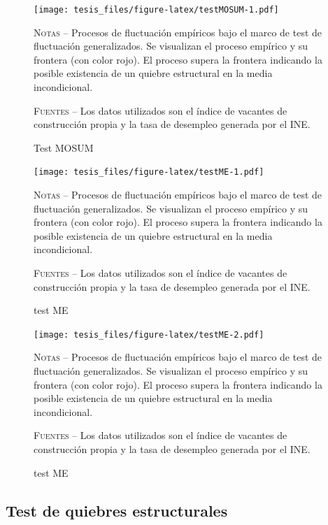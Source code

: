 \documentclass[12pt,oneside]{reedthesis}
\begin{document}
\begin{figure}
\texttt{[image: tesis\_files/figure-latex/testMOSUM-1.pdf]}
\caption{Test MOSUM}\label{fig:testMOSUM}\textsc{}

\footnotesize\textsc{Notas} -- Procesos de fluctuación empíricos bajo el marco de test de fluctuación generalizados. Se visualizan el proceso empírico y su frontera (con color rojo). El proceso supera la frontera indicando la posible existencia de un quiebre estructural en la media incondicional.

\textsc{Fuentes} -- Los datos utilizados son el índice de vacantes de construcción propia y la tasa de desempleo generada por el INE.
\end{figure}
\begin{figure}
\texttt{[image: tesis\_files/figure-latex/testME-1.pdf]}
\caption{test ME}\label{fig:testME}\textsc{}

\footnotesize\textsc{Notas} -- Procesos de fluctuación empíricos bajo el marco de test de fluctuación generalizados. Se visualizan el proceso empírico y su frontera (con color rojo). El proceso supera la frontera indicando la posible existencia de un quiebre estructural en la media incondicional.

\textsc{Fuentes} -- Los datos utilizados son el índice de vacantes de construcción propia y la tasa de desempleo generada por el INE.
\end{figure}
\begin{figure}
\texttt{[image: tesis\_files/figure-latex/testME-2.pdf]}
\caption{test ME}\label{fig:testME}\textsc{}

\footnotesize\textsc{Notas} -- Procesos de fluctuación empíricos bajo el marco de test de fluctuación generalizados. Se visualizan el proceso empírico y su frontera (con color rojo). El proceso supera la frontera indicando la posible existencia de un quiebre estructural en la media incondicional.

\textsc{Fuentes} -- Los datos utilizados son el índice de vacantes de construcción propia y la tasa de desempleo generada por el INE.
\end{figure}
\hypertarget{test-de-quiebres-estructurales}{%
\subsection{Test de quiebres estructurales}\label{test-de-quiebres-estructurales}}
\end{document}
